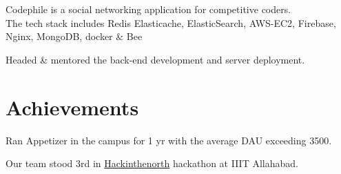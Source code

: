 \documentclass[letterpaper]{deedy-resume} %
\begin{document}
\begin{minipage}[t]{0.66\textwidth}

Codephile is a social networking application for competitive coders.\\
The tech stack includes Redis Elasticache, ElasticSearch, AWS-EC2, Firebase, Nginx, MongoDB, docker \& Bee
\begin{tightitemize}
\item Headed \& mentored the back-end development and server deployment.
\end{tightitemize}




\section{Achievements} 
\begin{tightitemize}
\sectionspace %
\item Ran Appetizer in the campus for 1 yr with the average DAU exceeding 3500. 
\item Our team stood 3rd in \href{https://www.hackinthenorth.com/}{Hackinthenorth} hackathon at IIIT Allahabad. 


\end{tightitemize}

\sectionspace %


\end{minipage} %

\end{document}
